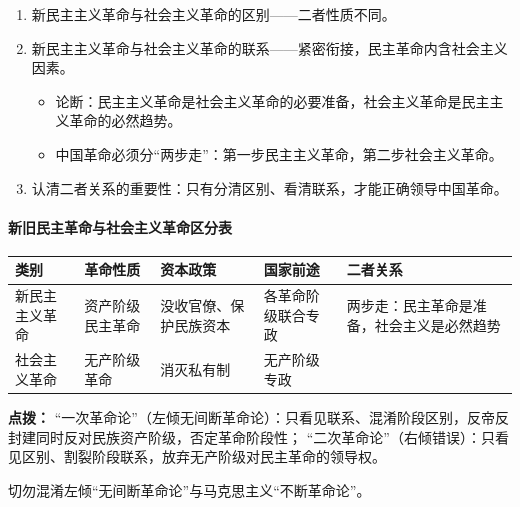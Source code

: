 \begin{enumerate}[resume]
    \item 新民主主义革命与社会主义革命的区别——二者性质不同。
    \item 新民主主义革命与社会主义革命的联系——紧密衔接，民主革命内含社会主义因素。
    \begin{itemize}
        \item 论断：民主主义革命是社会主义革命的必要准备，社会主义革命是民主主义革命的必然趋势。
        \item 中国革命必须分“两步走”：第一步民主主义革命，第二步社会主义革命。
    \end{itemize}
    \item 认清二者关系的重要性：只有分清区别、看清联系，才能正确领导中国革命。
\end{enumerate}

\vspace{0.4em}
\paragraph{新旧民主革命与社会主义革命区分表}
\begin{center}
\begin{tabularx}{0.97\textwidth}{|>{\centering\arraybackslash}X|>{\centering\arraybackslash}X|>{\centering\arraybackslash}X|>{\centering\arraybackslash}X|>{\centering\arraybackslash}X|}
\hline
\rowcolor{orange!10} 类别 & 革命性质 & 资本政策 & 国家前途 & 二者关系 \\
\hline
新民主主义革命 & 资产阶级民主革命 & 没收官僚、保护民族资本 & 各革命阶级联合专政 & \multirow{2}{=}两步走：民主革命是准备，社会主义是必然趋势 \\
\cline{1-4}
社会主义革命 & 无产阶级革命 & 消灭私有制 & 无产阶级专政 & \\
\hline
\end{tabularx}
\end{center}

\vspace{0.4em}
\noindent\sloppy\colorbox{orange!10}{
    \begin{minipage}{0.92\textwidth}
        \textbf{点拨：}
         “一次革命论”（左倾无间断革命论）：只看见联系、混淆阶段区别，反帝反封建同时反对民族资产阶级，否定革命阶段性；
         “二次革命论”（右倾错误）：只看见区别、割裂阶段联系，放弃无产阶级对民主革命的领导权。
        \par 切勿混淆左倾“无间断革命论”与马克思主义“不断革命论”。
    \end{minipage}
}
\vspace{0.4em}

